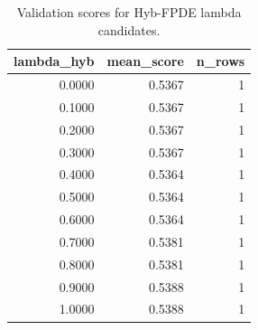 \begin{table}[t]
\caption{Validation scores for Hyb-FPDE lambda candidates.}
\label{tab:lambda_distribution_computed}
\centering
\begin{tabular}{rrr}
\toprule
lambda\_hyb & mean\_score & n\_rows \\
\midrule
0.0000 & 0.5367 & 1 \\
0.1000 & 0.5367 & 1 \\
0.2000 & 0.5367 & 1 \\
0.3000 & 0.5367 & 1 \\
0.4000 & 0.5364 & 1 \\
0.5000 & 0.5364 & 1 \\
0.6000 & 0.5364 & 1 \\
0.7000 & 0.5381 & 1 \\
0.8000 & 0.5381 & 1 \\
0.9000 & 0.5388 & 1 \\
1.0000 & 0.5388 & 1 \\
\bottomrule
\end{tabular}

\end{table}
